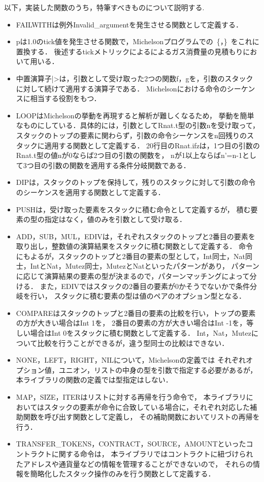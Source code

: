 \documentclass{kuisthesis}
\begin{document}
以下，実装した関数のうち，特筆すべきものについて説明する.
\begin{itemize}
  \item FAILWITHは例外Invalid\_argumentを発生させる関数として定義する．
  \item pは1.0のtick値を発生させる関数で，Michelsonプログラムでの\ \{，\}\ をこれに置換する．
  後述するtickメトリックによるによるガス消費量の見積もりにおいて用いる．
  \item 中置演算子|>は，引数として受け取った2つの関数f，gを，引数のスタックに対して続けて適用する演算子である．
  Michelsonにおける命令のシーケンスに相当する役割をもつ．
  \item LOOPはMichelsonの挙動を再現すると解析が難しくなるため，
  挙動を簡単なものにしている．具体的には，引数としてRnat.t型の引数nを受け取って，
  スタックのトップの要素に関わらず，引数の命令シーケンスをn回残りのスタックに適用する関数として定義する．
  20行目のRnat.ifzは，1つ目の引数のRnat.t型の値nが0ならば2つ目の引数の関数を，
  nが1以上ならばn'=n-1として3つ目の引数の関数を適用する条件分岐関数である．
  \item DIPは，スタックのトップを保持して，残りのスタックに対して引数の命令のシーケンスを適用する関数として定義する．
  \item PUSHは，受け取った要素をスタックに積む命令として定義するが，
  積む要素の型の指定はなく，値のみを引数として受け取る．
  \item ADD，SUB，MUL，EDIVは，それぞれスタックのトップと2番目の要素を取り出し，整数値の演算結果をスタックに積む関数として定義する．
  命令にもよるが，スタックのトップと2番目の要素の型として，Int同士，Nat同士，IntとNat，Mutez同士，MutezとNatといったパターンがあり，
  パターンに応じて演算結果の要素の型が決まるので，パターンマッチングによって分ける．
  また，EDIVではスタックの2番目の要素が0かそうでないかで条件分岐を行い，
  スタックに積む要素の型は値のペアのオプション型となる．
  \item COMPAREはスタックのトップと2番目の要素の比較を行い，トップの要素の方が大きい場合はInt 1を，
  2番目の要素の方が大きい場合はInt -1を，等しい場合はInt 0をスタックに積む関数として定義する．
  Int，Nat，Mutezについて比較を行うことができるが，違う型同士の比較はできない．
  \item NONE，LEFT，RIGHT，NILについて，Michelsonの定義では
  それぞれオプション値，ユニオン，リストの中身の型を引数で指定する必要があるが，
  本ライブラリの関数の定義では型指定はしない．
  \item MAP，SIZE，ITERはリストに対する再帰を行う命令で，
  本ライブラリにおいてはスタックの要素が命令に合致している場合に，それぞれ対応した補助関数を呼び出す関数として定義し，
  その補助関数においてリストの再帰を行う．
  \item TRANSFER\_TOKENS，CONTRACT，SOURCE，AMOUNTといったコントラクトに関する命令は，
  本ライブラリではコントラクトに紐づけられたアドレスや通貨量などの情報を管理することができないので，
  それらの情報を簡略化したスタック操作のみを行う関数として定義する．
\end{itemize}
\end{document}
